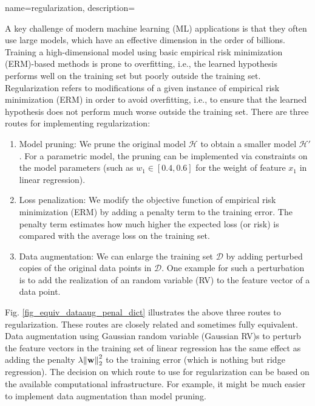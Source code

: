 {
{name={regularization}, 
	description={A key challenge of modern machine learning (ML) applications is that they often 
		use large models, which have an effective dimension in the order of billions. 
		Training a high-dimensional model using basic empirical risk minimization (ERM)-based methods
		is prone to overfitting, i.e., the learned hypothesis performs well on the training set 
		but poorly outside the training set. Regularization refers to modifications of a given instance 
		of empirical risk minimization (ERM) in order to avoid overfitting, i.e., to ensure that the learned hypothesis does 
		not perform much worse outside the training set. There are three routes for implementing 
		regularization: 
		\begin{enumerate}[label=\arabic*)]
			\item {Model pruning:} We prune the original model $\mathcal{H}$ to obtain a 
			smaller model $\mathcal{H}'$. For a parametric model, the pruning can be 
			implemented via constraints on the model parameters (such as $w_{1} \in [0.4,0.6]$ for 
			the weight of feature $x_{1}$ in linear regression).
			\item {Loss penalization:} We modify the objective function of empirical risk minimization (ERM) by adding a 
			penalty term to the training error. The penalty term estimates how much higher the expected loss (or risk) 
			is compared with the average loss on the training set. 
			\item {Data augmentation:} We can enlarge the training set $\mathcal{D}$ by adding 
			perturbed copies of the original data points in $\mathcal{D}$. One example for such 
			a perturbation is to add the realization of an random variable (RV) to the feature vector 
			of a data point. 
		\end{enumerate} 
		Fig. \ref{fig_equiv_dataaug_penal_dict} illustrates the above three routes to regularization. 
		These routes are closely related and sometimes fully equivalent. Data augmentation using Gaussian random variable (Gaussian RV)s 
		to perturb the feature vectors in the training set of linear regression 
		has the same effect as adding the penalty 
		$\lambda \mleft\lVert {\bf w} \mright\rVert_{2}^2$ to the training error (which is nothing but ridge regression). 
        		The decision on which route to use for regularization can be based on the 
        		available computational infrastructure. For example, it might be much easier to 
        		implement data augmentation than model pruning. 
		\begin{figure}[H]
			\begin{center} 
				\begin{tikzpicture}[scale = 1]
					

\end{tikzpicture}
\end{center}
\end{figure}}}}
